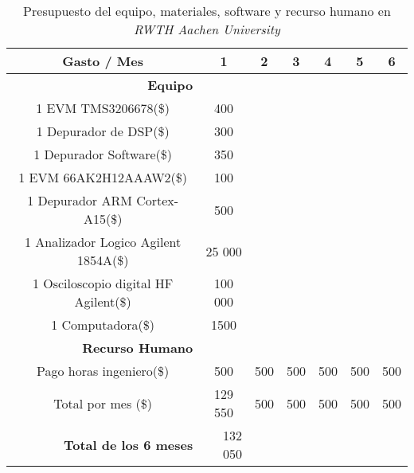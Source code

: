 \newpage

\begin{table}[ht]
\caption{Presupuesto del equipo, materiales, software y recurso humano en \textit{RWTH Aachen University}}
  \centering
  \begin{tabular}{| c | c | c | c | c | c | c |}
  \hline\hline
   Gasto / Mes 			& 1 & 2 & 3 & 4 & 5 & 6 			\\ \hline\hline
   \multicolumn{1}{|r}{\textbf{Equipo}} & \multicolumn{1}{r}{} & \multicolumn{1}{r}{} & \multicolumn{1}{r}{} & \multicolumn{1}{r}{} & \multicolumn{1}{r}{} & \multicolumn{1}{r|}{} \\ \hline
   1 EVM TMS3206678(\$)		& 400 & \multicolumn{1}{r}{} & \multicolumn{1}{r}{} & \multicolumn{1}{r}{} & \multicolumn{1}{r}{} & \multicolumn{1}{r|}{} \\ \hline 
   1 Depurador de DSP(\$)	& 300 & \multicolumn{1}{r}{} & \multicolumn{1}{r}{} & \multicolumn{1}{r}{} & \multicolumn{1}{r}{} & \multicolumn{1}{r|}{} \\ \hline
   1 Depurador Software(\$)	& 350 & \multicolumn{1}{r}{} & \multicolumn{1}{r}{} & \multicolumn{1}{r}{} & \multicolumn{1}{r}{} & \multicolumn{1}{r|}{} \\ \hline
   1 EVM 66AK2H12AAAW2(\$)	& 100 & \multicolumn{1}{r}{} & \multicolumn{1}{r}{} & \multicolumn{1}{r}{} & \multicolumn{1}{r}{} & \multicolumn{1}{r|}{} \\ \hline
   1 Depurador ARM Cortex-A15(\$) & 500 & \multicolumn{1}{r}{} & \multicolumn{1}{r}{} & \multicolumn{1}{r}{} & \multicolumn{1}{r}{} & \multicolumn{1}{r|}{} \\ \hline
   1 Analizador Logico Agilent 1854A(\$) & 25 000 & \multicolumn{1}{r}{} & \multicolumn{1}{r}{} & \multicolumn{1}{r}{} & \multicolumn{1}{r}{} & \multicolumn{1}{r|}{} \\ \hline
   1 Osciloscopio digital HF Agilent(\$) & 100 000 & \multicolumn{1}{r}{} & \multicolumn{1}{r}{} & \multicolumn{1}{r}{} & \multicolumn{1}{r}{} & \multicolumn{1}{r|}{} \\ \hline
   1 Computadora(\$)		& 1500 & \multicolumn{1}{r}{} & \multicolumn{1}{r}{} & \multicolumn{1}{r}{} & \multicolumn{1}{r}{} & \multicolumn{1}{r|}{} \\ \hline
   \multicolumn{1}{|r}{\textbf{Recurso Humano}} & \multicolumn{1}{r}{} & \multicolumn{1}{r}{} & \multicolumn{1}{r}{} & \multicolumn{1}{r}{} & \multicolumn{1}{r}{} & \multicolumn{1}{r|}{} \\ \hline
   Pago horas ingeniero(\$)    & 500 & 500 & 500 & 500 & 500 & \multicolumn{1}{r|}{500} \\ \hline
   Total por mes (\$)		& 129 550 & 500 & 500 & 500 & 500 & \multicolumn{1}{r|}{500} \\ \hline
   \multicolumn{1}{|r}{\textbf{Total de los 6 meses}} & \multicolumn{1}{|r}{132 050} & \multicolumn{1}{r}{} & \multicolumn{1}{r}{} & \multicolumn{1}{r}{} & \multicolumn{1}{r}{} & \multicolumn{1}{r|}{} \\ \hline\hline
   
  \end{tabular}
  \label{tab:Presupuesto del equipo, materiales, software y recurso humano en RWTH Aachen University}
 
 
\end{table}


